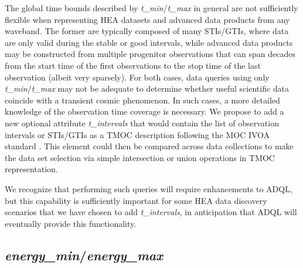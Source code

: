 \documentclass[11pt,a4paper]{ivoa}
\begin{document}
The global time bounds described by {\em t\_min\/}/{\em t\_max} in general are not sufficiently flexible when representing \gls{HEA} datasets and advanced data products from any waveband.  The former are typically composed of many \glspl{STI}/\glspl{GTI}, where data are only valid during the stable or good intervals, while advanced data products may be constructed from multiple progenitor observations that can span decades from the start time of the first observations to the stop time of the last observation (albeit very sparsely).  For both cases, data queries using only {\em t\_min\/}/{\em t\_max} may not be adequate to determine whether useful scientific data coincide with a transient cosmic phenomenon.  In such cases, a more detailed knowledge of the observation time coverage is necessary.  We propose to add a new optional attribute {\em t\_intervals} that would contain the list of observation intervals or STIs/GTIs as a TMOC description following the \gls{MOC} IVOA standard  \citep{2022ivoa.spec.0727F}. This element could then be compared across data collections to make the data set selection via simple intersection or union operations in TMOC representation.

We recognize that performing such queries will require enhancements to ADQL, but this capability is sufficiently important for some \gls{HEA} data discovery scenarios that we have chosen to add {\em t\_intervals\/}, in anticipation that ADQL will eventually provide this functionality.

\subsection{{\em energy\_min\/}/{\em energy\_max\/}}
\end{document}
